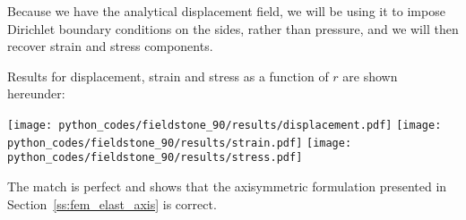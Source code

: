 Because we have the analytical displacement field, we will be using it to 
impose Dirichlet boundary conditions on the sides, rather than pressure, and 
we will then recover strain and stress components.

Results for displacement, strain and stress as a function of $r$ are shown hereunder:
\begin{center}
\texttt{[image: python\_codes/fieldstone\_90/results/displacement.pdf]}
\texttt{[image: python\_codes/fieldstone\_90/results/strain.pdf]}
\texttt{[image: python\_codes/fieldstone\_90/results/stress.pdf]}
\end{center}
The match is perfect and shows that the axisymmetric formulation presented in Section~\ref{ss:fem_elast_axis} is correct.

